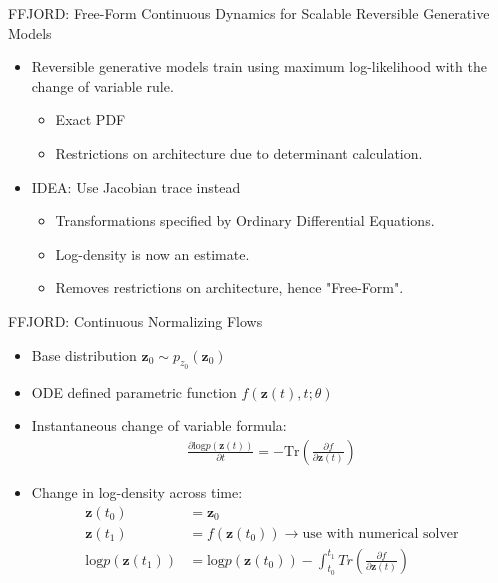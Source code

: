 \begin{frame}{FFJORD: Free-Form Continuous Dynamics for Scalable Reversible Generative Models}
    \begin{itemize}
        \item Reversible generative models train using maximum log-likelihood with the change of variable rule.
            \begin{itemize}
                \item Exact PDF
                \item Restrictions on architecture due to determinant calculation.
            \end{itemize}
        \item IDEA: Use Jacobian trace instead
            \begin{itemize}
                \item Transformations specified by Ordinary Differential Equations.
                \item Log-density is now an estimate.
                \item Removes restrictions on architecture, hence "Free-Form".
            \end{itemize}
    \end{itemize}
\end{frame}
\begin{frame}{FFJORD: Continuous Normalizing Flows}
\begin{itemize}
    \item Base distribution $\mathbf{z}_0 \sim p_{z_0}(\mathbf{z}_0)$
    \item ODE defined parametric function $f(\mathbf{z}(t), t; \theta)$
    \item Instantaneous change of variable formula:
    \begin{align*}
        \frac{\partial \text{log} p(\mathbf{z}(t))}{\partial t} = - \text{Tr}(\frac{\partial f}{\partial \mathbf{z}(t)})
    \end{align*}
    \item Change in log-density across time:
    \begin{align*}
        \mathbf{z}(t_0) &= \mathbf{z}_0\\
        \mathbf{z}(t_1) &= f(\mathbf{z}(t_0)) \longrightarrow \text{use with numerical solver}\\
        \text{log} p(\mathbf{z}(t_1)) &= \text{log} p(\mathbf{z}(t_0)) - \int^{t_1}_{t_0}Tr(\frac{\partial f}{\partial \mathbf{z}(t)})
    \end{align*}
\end{itemize}
\end{frame}
